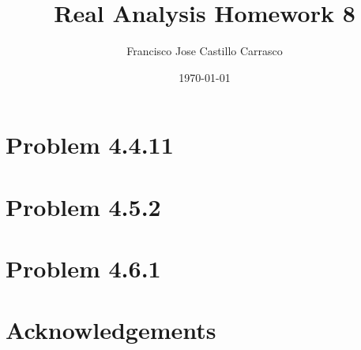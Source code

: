 




\title{Real Analysis Homework 8}
\author{Francisco Jose Castillo Carrasco}
\date{\today}
\maketitle




\section{Problem 4.4.11}

\newpage
\section{Problem 4.5.2}


\section{Problem 4.6.1}


\section*{Acknowledgements}






